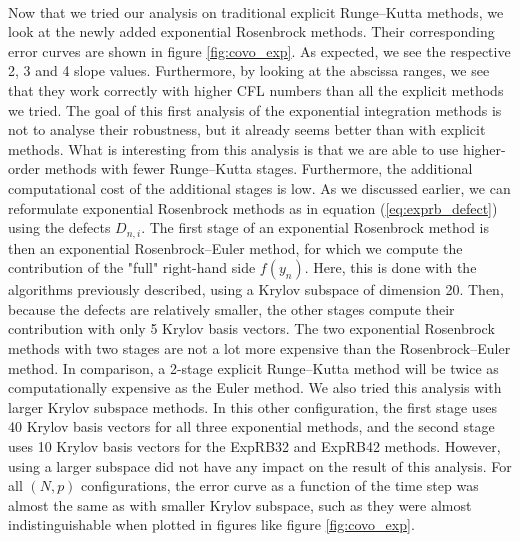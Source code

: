       \paragraph{}
      Now that we tried our analysis on traditional explicit Runge--Kutta methods, we look at the newly added exponential Rosenbrock methods.
      Their corresponding error curves are shown in figure \ref{fig:covo_exp}.
      As expected, we see the respective 2, 3 and 4 slope values.
      Furthermore, by looking at the abscissa ranges, we see that they work correctly with higher CFL numbers than all the explicit methods we tried.
      The goal of this first analysis of the exponential integration methods is not to analyse their robustness, but it already seems better than with explicit methods.
      What is interesting from this analysis is that we are able to use higher-order methods with fewer Runge--Kutta stages.
      Furthermore, the additional computational cost of the additional stages is low.
      As we discussed earlier, we can reformulate exponential Rosenbrock methods as in equation (\ref{eq:exprb_defect})  using the defects $D_{n, i}$.
      The first stage of an exponential Rosenbrock method is then an exponential Rosenbrock--Euler method, for which we compute the contribution of the "full" right-hand side $f\left(y_n\right)$.
      Here, this is done with the algorithms previously described, using a Krylov subspace of dimension 20.
      Then, because the defects are relatively smaller, the other stages compute their contribution with only 5 Krylov basis vectors.
      The two exponential Rosenbrock methods with two stages are not a lot more expensive than the Rosenbrock--Euler method.
      In comparison, a 2-stage explicit Runge--Kutta method will be twice as computationally expensive as the Euler method.
      We also tried this analysis with larger Krylov subspace methods.
      In this other configuration, the first stage uses 40 Krylov basis vectors for all three exponential methods, and the second stage uses 10 Krylov basis vectors for the ExpRB32 and ExpRB42 methods.
      However, using a larger subspace did not have any impact on the result of this analysis.
      For all $\left(N, p\right)$ configurations, the error curve as a function of the time step was almost the same as with smaller Krylov subspace, such as they were almost indistinguishable when plotted in figures like figure \ref{fig:covo_exp}.

